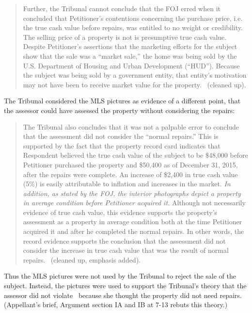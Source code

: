 \documentclass[12pt,\documentclassflag]{michiganCourtOfAppealsBrief}
\begin{document}
\begin{quote}
Further, the Tribunal cannot conclude that the FOJ erred when it
concluded that Petitioner's contentions concerning the purchase price, i.e. the true cash value before repairs, was entitled to no weight or credibility. The selling price of a property is not is presumptive true cash value. Despite Petitioner's assertions that the marketing efforts for the subject show that the sale was a ``market sale,'' the home was
being sold by the U.S. Department of Housing and Urban Development (``HUD''). Because the subject was being sold by a government entity, that entity's motivation may not have been to receive market value for the property. \reconsiderationDenied[2]\ (cleaned up).
\end{quote}

The Tribunal considered the MLS pictures as evidence of a different point, that the assessor could have assessed the property without considering the repairs:

\begin{quote}
  The Tribunal also concludes that it was not a palpable error to conclude that the assessment did not consider the ``normal repairs.'' This is supported by the fact that the property record card indicates that Respondent believed the true cash value of the subject to be \$48,000 before Petitioner purchased the property and \$50,400 as of December 31, 2015, after the repairs were complete. An increase of \$2,400 in true cash value (5\%) is easily attributable to inflation and increases in the market. {\em In addition, as stated by the FOJ, the interior photographs depict a property in average condition before Petitioner acquired it.} Although not necessarily evidence of true cash value, this evidence supports the property's assessment as a property in average condition both at the time Petitioner acquired it and after he completed the normal repairs. In other words, the record evidence supports the conclusion that the assessment did not consider the increase in true cash value that was the result of normal repairs. \reconsiderationDenied[2]\ (cleaned up, emphasis added).
\end{quote}

Thus the MLS pictures were not used by the Tribunal to reject the sale of the subject. Instead, the pictures were used to support the Tribunal's theory that the assessor did not violate \mathieuGast\ because she thought the property did not need repairs. (Appellant's brief, Argument section IA and IB at 7-13 rebuts this theory.)
\end{document}
